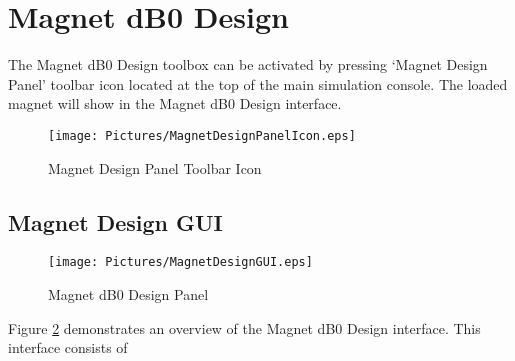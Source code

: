 \documentclass{book}%
\begin{document}
\section{Magnet dB0 Design}

The Magnet dB0 Design toolbox can be activated by pressing `Magnet Design Panel' toolbar icon located at the top of the main simulation console. The loaded magnet will show in the Magnet dB0 Design interface.

\begin{figure}[htbp]
	\centering
		\texttt{[image: Pictures/MagnetDesignPanelIcon.eps]}
	\caption{Magnet Design Panel Toolbar Icon}
	\label{fig:MagnetDesignPanelIcon}
\end{figure}

\subsection{Magnet Design GUI}

\begin{figure}[htbp]
	\centering
		\texttt{[image: Pictures/MagnetDesignGUI.eps]}
	\caption{Magnet dB0 Design Panel}
	\label{fig:MagnetDesignGUI}
\end{figure}

Figure \ref{fig:MagnetDesignGUI} demonstrates an overview of the Magnet dB0 Design interface. This interface consists of 
\end{document}
